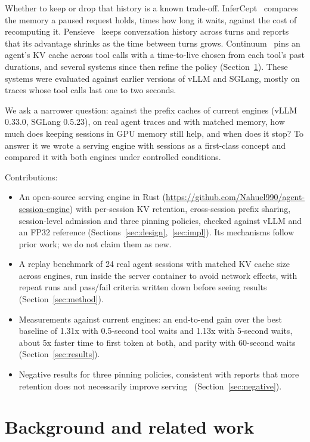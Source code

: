 \documentclass[11pt]{article}
\begin{document}
Whether to keep or drop that history is a known trade-off. InferCept~\cite{infercept} compares the memory a paused request holds, times how long it waits, against the cost of recomputing it. Pensieve~\cite{pensieve} keeps conversation history across turns and reports that its advantage shrinks as the time between turns grows. Continuum~\cite{continuum} pins an agent's KV cache across tool calls with a time-to-live chosen from each tool's past durations, and several systems since then refine the policy (Section~\ref{sec:related}). These systems were evaluated against earlier versions of vLLM and SGLang, mostly on traces whose tool calls last one to two seconds.

We ask a narrower question: against the prefix caches of current engines (vLLM 0.33.0, SGLang 0.5.23), on real agent traces and with matched memory, how much does keeping sessions in GPU memory still help, and when does it stop? To answer it we wrote a serving engine with sessions as a first-class concept and compared it with both engines under controlled conditions.

Contributions:
\begin{itemize}
  \item An open-source serving engine in Rust (\url{https://github.com/Nahuel990/agent-session-engine}) with per-session KV retention, cross-session prefix sharing, session-level admission and three pinning policies, checked against vLLM and an FP32 reference (Sections~\ref{sec:design},~\ref{sec:impl}). Its mechanisms follow prior work; we do not claim them as new.
  \item A replay benchmark of 24 real agent sessions with matched KV cache size across engines, run inside the server container to avoid network effects, with repeat runs and pass/fail criteria written down before seeing results (Section~\ref{sec:method}).
  \item Measurements against current engines: an end-to-end gain over the best baseline of 1.31x with 0.5-second tool waits and 1.13x with 5-second waits, about 5x faster time to first token at both, and parity with 60-second waits (Section~\ref{sec:results}).
  \item Negative results for three pinning policies, consistent with reports that more retention does not necessarily improve serving~\cite{choijoshi,agentservesim} (Section~\ref{sec:negative}).
\end{itemize}

\section{Background and related work}
\label{sec:related}
\end{document}
